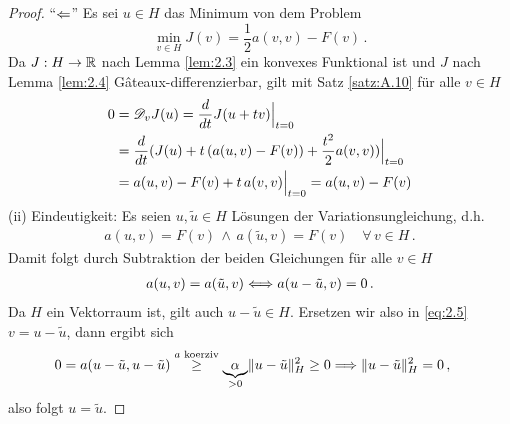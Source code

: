 \begin{itemize}
\begin{proof}
"`$\Leftarrow$"' Es sei $u \in H$ das Minimum von dem Problem
\[
	\min_{v\in H} J(v) = \frac 1 2 a(v,v) -F(v) \, .
\]
Da $J:H\rightarrow \mathbb{R}$ nach Lemma \ref{lem:2.3} ein konvexes Funktional ist und $J$ nach Lemma \ref{lem:2.4} Gâteaux-differenzierbar, gilt mit Satz \ref{satz:A.10} für alle $v \in H$
\begin{align*}
	0& = \mathscr D_vJ(u) = \frac d{dt} J(u+tv)\Big|_{t=0} \\
	& = \frac d{dt}(J(u) + t \, (a(u,v)-F(v))+\frac{t^2}2 a(v,v))\Big|_{t=0} \\
	& = a(u,v)-F(v) + t \, a(v,v) \Big|_{t=0} = a(u,v)-F(v)
\end{align*}
(ii) Eindeutigkeit: Es seien $u,\tilde u \in H$ Lösungen der Variationsungleichung, d.h.
\begin{align*}
	a(u,v) = F(v) \, \wedge \, a(\tilde u,v) = F(v) \quad \forall \, v \in H \, .
\end{align*}
Damit folgt durch Subtraktion der beiden Gleichungen für alle $v \in H$
\begin{align}\label{eq:2.5}
	a(u,v) = a(\tilde u,v) \Longleftrightarrow a(u-\tilde u,v) = 0 \, .
\end{align}
Da $H$ ein Vektorraum ist, gilt auch $u-\tilde u \in H$. Ersetzen wir also in \eqref{eq:2.5} $v = u-\tilde u$, dann ergibt sich
\begin{align*}
	&0 = a(u-\tilde u,u-\tilde u) \stackrel{\scriptsize a\text{ koerziv}}\ge \underbrace{\alpha}_{>0} \lVert u-\tilde u\rVert_H^2 \ge 0 
	\Longrightarrow\lVert u-\tilde u\rVert_H^2 = 0 \, ,
\end{align*}
also folgt $u = \tilde u$.


\end{proof}
\end{itemize}
